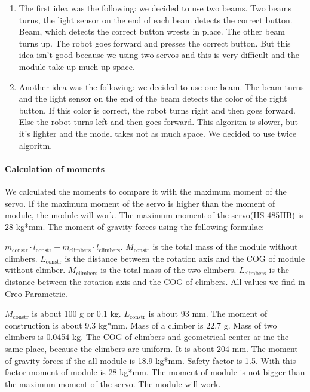 	\begin{enumerate}	
		\item The first idea was the following: we decided to use two beams. Two beams turns, the light sensor on the end of each beam detects the correct button. Beam, which detects the correct button wrests in place. The other beam turns up. The robot goes forward and presses the correct button. But this idea isn't good because we using two servos and this is very difficult and the module take up much up space.
	
		\item Another idea was the following: we decided to use one beam. The beam turns and the light sensor on the end of the beam detects the color of the right button. If this color is correct, the robot turns right and then goes forward. Else the robot turns left and then goes forward. This algoritm is slower, but it's lighter and the model takes not as much space. We decided to use twice algoritm.
	\end{enumerate}
	
	\paragraph{Calculation of moments}
	
	We calculated the moments to compare it with the maximum moment of the servo. If the maximum moment of the servo is higher than the moment of module, the module will work. The maximum moment of the servo(HS-485HB) is 28 kg*mm. The moment of gravity forces using the following formulae: 
	
	$m_\text{constr} \cdot l_\text{constr} + m_\text{climbers} \cdot l_\text{climbers}$.	
	 $M_\text{constr}$ is the total mass of the module without climbers. $L_\text{constr}$ is the distance between the rotation axis and the COG of module without climber. $M_\text{climbers}$ is the total mass of the two climbers. $L_\text{climbers}$ is the distance between the rotation axis and the COG of climbers. All values we find in Creo Parametric.
	 
	 $M_\text{constr}$ is about 100 g or 0.1 kg. $L_\text{constr}$ is about 93 mm. The moment of construction is about 9.3 kg*mm. Mass of a climber is 22.7 g. Mass of two climbers is 0.0454 kg. The COG of climbers and geometrical center ar ine the same place, because the climbers are uniform. It is about 204 mm. The moment of gravity forces if the all module is 18.9 kg*mm. Safety factor is 1.5. With this factor moment of module is 28 kg*mm. The moment of module is not bigger than the maximum moment of the servo. The module will work.
	 
